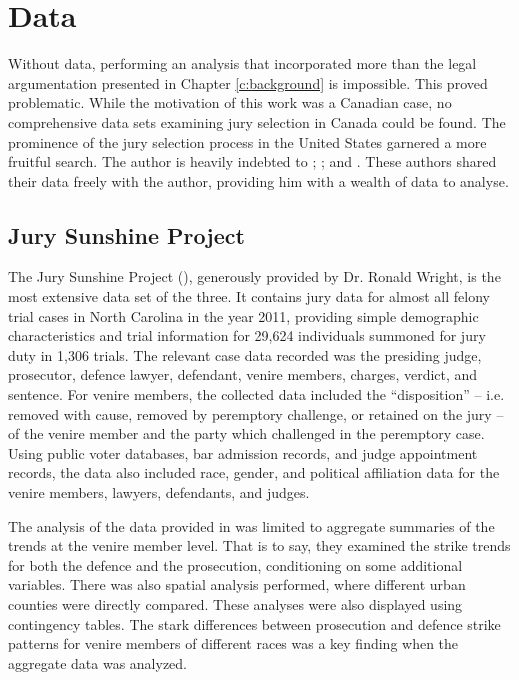 \section{Data} \label{c:data}

Without data, performing an analysis that incorporated more than the legal argumentation presented in Chapter
\ref{c:background} is impossible. This proved problematic. While the motivation of this work was a Canadian case, no comprehensive
data sets examining jury selection in Canada could be found. The prominence of the jury selection process
in the United States garnered a more fruitful search. The author is heavily indebted to \citeauthor{JurySunshineProj}; \citeauthor{StubbornLegacy}; and
\citeauthor{PerempChalMurder}. These authors shared their data freely with the author, providing him with a wealth of data to
analyse.

\subsection{Jury Sunshine Project} \label{sec:jspdata}

The Jury Sunshine Project (\cite{JurySunshineProj}), generously provided by Dr. Ronald Wright, is the most extensive data set of the three. It
contains jury data for almost all felony trial cases in North Carolina in the year 2011, providing simple demographic
characteristics and trial information for 29,624 individuals summoned
for jury duty in 1,306 trials. The relevant case data recorded was the presiding judge, prosecutor, defence lawyer, defendant, venire members,
charges, verdict, and sentence. For venire members, the collected data included the ``disposition'' -- i.e. removed with cause, removed by peremptory challenge, or retained on the jury -- of the venire member and the party which challenged in the peremptory case. Using public voter databases, bar admission records, and judge appointment records, the data also included race, gender, and political
affiliation data for the venire members, lawyers, defendants, and judges.

The analysis of the data provided in \cite{JurySunshineProj} was limited to aggregate summaries of the trends at the venire
member level. That is to say, they examined the strike trends for both the defence and the prosecution, conditioning on some
additional variables. There was also spatial analysis performed, where different urban counties were directly compared. These
analyses were also displayed using contingency tables. The stark differences between prosecution and defence strike patterns
for venire members of different races was a key finding when the aggregate data was analyzed.

